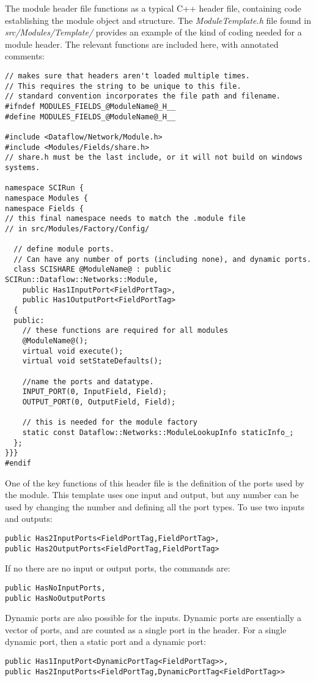 \documentclass[fleqn,11pt,openany]{book}
\begin{document}
The module header file functions as a typical C++ header file, containing code establishing the module object and structure.  
The \emph{ModuleTemplate.h} file found in \emph{src/Modules/Template/} provides an example of the kind of coding needed for a module header.  
The relevant functions are included here, with annotated comments:
\begin{verbatim}
// makes sure that headers aren't loaded multiple times. 
// This requires the string to be unique to this file.
// standard convention incorporates the file path and filename.
#ifndef MODULES_FIELDS_@ModuleName@_H__
#define MODULES_FIELDS_@ModuleName@_H__

#include <Dataflow/Network/Module.h>
#include <Modules/Fields/share.h>
// share.h must be the last include, or it will not build on windows systems.

namespace SCIRun {
namespace Modules {
namespace Fields {
// this final namespace needs to match the .module file
// in src/Modules/Factory/Config/
  
  // define module ports.  
  // Can have any number of ports (including none), and dynamic ports.
  class SCISHARE @ModuleName@ : public SCIRun::Dataflow::Networks::Module,
    public Has1InputPort<FieldPortTag>,
    public Has1OutputPort<FieldPortTag>
  {
  public:
    // these functions are required for all modules
    @ModuleName@();
    virtual void execute();
    virtual void setStateDefaults();
    
    //name the ports and datatype.
    INPUT_PORT(0, InputField, Field);
    OUTPUT_PORT(0, OutputField, Field);
  
    // this is needed for the module factory
    static const Dataflow::Networks::ModuleLookupInfo staticInfo_;
  };
}}}
#endif
\end{verbatim}
One of the key functions of this header file is the definition of the ports used by the module.  
This template uses one input and output, but any number can be used by changing the number and defining all the port types.
To use two inputs and outputs:
\begin{verbatim}
public Has2InputPorts<FieldPortTag,FieldPortTag>,
public Has2OutputPorts<FieldPortTag,FieldPortTag>
\end{verbatim}
If no there are no input or output ports, the commands are:
\begin{verbatim}
public HasNoInputPorts,
public HasNoOutputPorts
\end{verbatim}
Dynamic ports are also possible for the inputs.  
Dynamic ports are essentially a vector of ports, and are counted as a single port in the header.
For a single dynamic port, then a static port and a dynamic port:
\begin{verbatim}
public Has1InputPort<DynamicPortTag<FieldPortTag>>,
public Has2InputPorts<FieldPortTag,DynamicPortTag<FieldPortTag>>
\end{verbatim}
\end{document}

